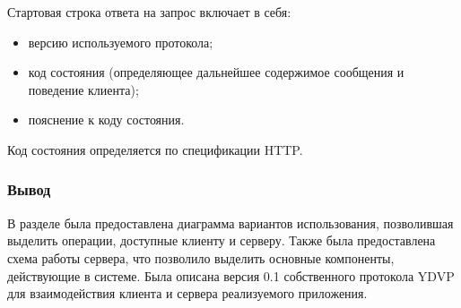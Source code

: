 Стартовая строка ответа на запрос включает в себя:
\begin{itemize}[leftmargin=1.6\parindent]
\item версию используемого протокола;
\item код состояния (определяющее дальнейшее содержимое сообщения и поведение клиента);
\item пояснение к коду состояния.
\end{itemize}

Код состояния определяется по спецификации HTTP.

\subsubsection*{Вывод}
В разделе была предоставлена диаграмма вариантов использования, позволившая выделить операции, доступные клиенту и серверу. Также была предоставлена схема работы сервера, что позволило выделить основные компоненты, действующие в системе. Была описана версия 0.1 собственного протокола YDVP для взаимодействия клиента и сервера реализуемого приложения.

\pagebreak